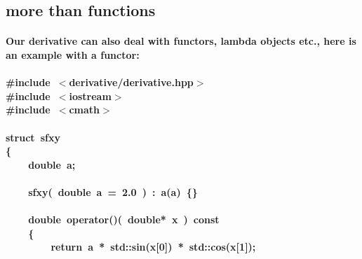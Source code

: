 \documentclass[9pt,onside]{article}
\newcommand{\hlstd}[1]{\textcolor[rgb]{0.2,0,0.4}{#1}}
\newcommand{\hlnum}[1]{\textcolor[rgb]{0.2,0.73,0.02}{#1}}
\newcommand{\hlppc}[1]{\textcolor[rgb]{0.33,0.45,0.69}{#1}}
\newcommand{\hlopt}[1]{\textcolor[rgb]{0.33,0.33,0.33}{#1}}
\newcommand{\hlkwa}[1]{\textcolor[rgb]{1,0.19,0.19}{#1}}
\newcommand{\hlkwb}[1]{\textcolor[rgb]{0.96,0.55,0.14}{#1}}
\newcommand{\hlkwc}[1]{\textcolor[rgb]{0,0,1}{#1}}
\newcommand{\hlkwd}[1]{\textcolor[rgb]{0.82,0.11,0.93}{#1}}
\begin{document}
\subsection{more than functions}
\paragraph{Our derivative can also deal with functors, lambda objects etc., here is an example with a functor:\\}
\noindent 
\ttfamily 
\paragraph{\hlppc{\#include\ $<$derivative/derivative.hpp$>$}\hspace*{\fill}\\
\hlppc{\#include\ $<$iostream$>$}\hspace*{\fill}\\
\hlstd{}\hlppc{\#include\ $<$cmath$>$}\hspace*{\fill}\\
\hlstd{}\hspace*{\fill}\\
\hlkwb{struct\ }\hlstd{sfxy}\hspace*{\fill}\\
\hlopt{\{}\hspace*{\fill}\\
\hlstd{}\hlstd{\ \ \ \ }\hlstd{}\hlkwb{double\ }\hlstd{a}\hlopt{;}\hspace*{\fill}\\
\hlstd{\hspace*{\fill}\\
}\hlstd{\ \ \ \ }\hlstd{}\hlkwd{sfxy}\hlstd{}\hlopt{(\ }\hlstd{}\hlkwb{double\ }\hlstd{a\textunderscore \ }\hlopt{=\ }\hlstd{}\hlnum{2.0\ }\hlstd{}\hlopt{)\ :\ }\hlstd{}\hlkwd{a}\hlstd{}\hlopt{(}\hlstd{a\textunderscore }\hlopt{)\ \{\}}\hspace*{\fill}\\
\hlstd{\hspace*{\fill}\\
}\hlstd{\ \ \ \ }\hlstd{}\hlkwb{double\ }\hlstd{}\hlkwc{operator}\hlstd{}\hlopt{()(\ }\hlstd{}\hlkwb{double}\hlstd{}\hlopt{{*}\ }\hlstd{x\ }\hlopt{)\ }\hlstd{}\hlkwb{const}\hspace*{\fill}\\
\hlstd{}\hlstd{\ \ \ \ }\hlstd{}\hlopt{\{}\hspace*{\fill}\\
\hlstd{}\hlstd{\ \ \ \ \ \ \ \ }\hlstd{}\hlkwa{return\ }\hlstd{a\ }\hlopt{{*}\ }\hlstd{std}\hlopt{::}\hlstd{}\hlkwd{sin}\hlstd{}\hlopt{(}\hlstd{x}\hlopt{{[}}\hlstd{}\hlnum{0}\hlstd{}\hlopt{{]})\ {*}\ }\hlstd{std}\hlopt{::}\hlstd{}\hlkwd{cos}\hlstd{}\hlopt{(}\hlstd{x}\hlopt{{[}}\hlstd{}\hlnum{1}\hlstd{}\hlopt{{]});}\hspace*{\fill}\\
}
\end{document}
